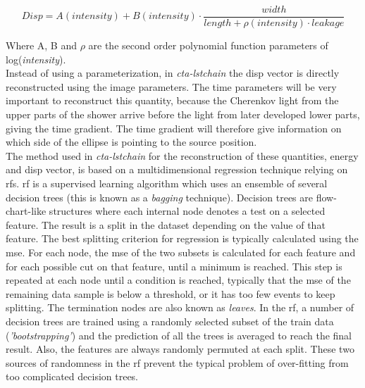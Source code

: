 \documentclass[main.tex]{subfiles}
\begin{document}
\begin{equation}
 Disp=A(intensity) + B(intensity) \cdot \frac{width}{length+\rho(intensity) \cdot leakage}  
\end{equation}

Where A, B and $\rho$ are the second order polynomial function parameters of log(\textit{intensity}).\\

Instead of using a parameterization, in \textit{cta-lstchain} the disp vector is directly reconstructed using the image parameters. The time parameters will be very important to reconstruct this quantity, because the Cherenkov light from the upper parts of the shower arrive before the light from later developed lower parts, giving the time gradient. The time gradient will therefore give information on which side of the ellipse is pointing to the source position.\\

The method used in \textit{cta-lstchain} for the reconstruction of these quantities, energy and disp vector, is based on a multidimensional regression technique relying on \glspl{rf}. \gls{rf} is a supervised learning algorithm which uses an ensemble of several decision trees (this is known as a \textit{bagging} technique). Decision trees are flow-chart-like structures where each internal node denotes a test on a selected feature. The result is a split in the dataset depending on the value of that feature. The best splitting criterion for regression is typically calculated using the \gls{mse}. For each node, the \gls{mse} of the two subsets is calculated for each feature and for each possible cut on that feature, until a minimum is reached. This step is repeated at each node until a condition is reached, typically that the \gls{mse} of the remaining data sample is below a threshold, or it has too few events to keep splitting. The termination nodes are also known as \textit{leaves}.
In the \gls{rf}, a number of decision trees are trained using a randomly selected subset of the train data (\textit{'bootstrapping'}) and the prediction of all the trees is averaged to reach the final result. Also, the features are always randomly permuted at each split. These two sources of randomness in the \gls{rf} prevent the typical problem of over-fitting from too complicated decision trees. 
\end{document}
